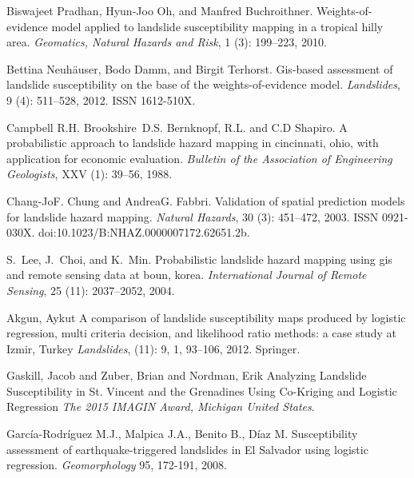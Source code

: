 \documentclass[11pt,twoside]{rmta2010eng}%
\begin{document}
\begin{thebibliography}{99}
Biswajeet Pradhan, Hyun-Joo Oh, and Manfred Buchroithner.
\newblock Weights-of-evidence model applied to landslide susceptibility mapping
  in a tropical hilly area.
\newblock \emph{Geomatics, Natural Hazards and Risk}, 1 (3):
  199--223, 2010.
  
  
Bettina Neuh\"auser, Bodo Damm, and Birgit Terhorst.
\newblock Gis-based assessment of landslide susceptibility on the base of the
  weights-of-evidence model.
\newblock \emph{Landslides}, 9 (4): 511--528, 2012.
\newblock ISSN 1612-510X.


Campbell R.H. Brookshire~D.S. Bernknopf, R.L. and C.D Shapiro.
\newblock A probabilistic approach to landslide hazard mapping in cincinnati,
  ohio, with application for economic evaluation.
\newblock \emph{Bulletin of the Association of Engineering Geologists},
  XXV (1): 39--56, 1988.
  
  
Chang-JoF. Chung and AndreaG. Fabbri.
\newblock Validation of spatial prediction models for landslide hazard mapping.
\newblock \emph{Natural Hazards}, 30 (3): 451--472, 2003.
\newblock ISSN 0921-030X.
\newblock doi:{10.1023/B:NHAZ.0000007172.62651.2b}.

S.~Lee, J.~Choi, and K.~Min.
\newblock Probabilistic landslide hazard mapping using gis and remote sensing
  data at boun, korea.
\newblock \emph{International Journal of Remote Sensing}, 25
  (11): 2037--2052, 2004.
  
  
  
Akgun, Aykut
\newblock A comparison of landslide susceptibility maps produced by logistic regression, multi criteria decision, and likelihood ratio methods: a case study at Izmir, Turkey
\newblock \emph{Landslides},
  (11): 9, 1, 93--106, 2012.
\newblock Springer. 


Gaskill, Jacob and Zuber, Brian and Nordman, Erik
\newblock Analyzing Landslide Susceptibility in St. Vincent and the Grenadines Using Co-Kriging and Logistic Regression
\newblock \emph{The 2015 IMAGIN Award, Michigan United States}.

  
Garc\'{i}a-Rodr\'{i}guez M.J., Malpica J.A., Benito B., D\'{i}az M.
\newblock  Susceptibility assessment of earthquake-triggered landslides in El Salvador using logistic regression.
\newblock \emph{Geomorphology}
 95, 172-191, 2008. 
  



\end{thebibliography}
\end{document}
